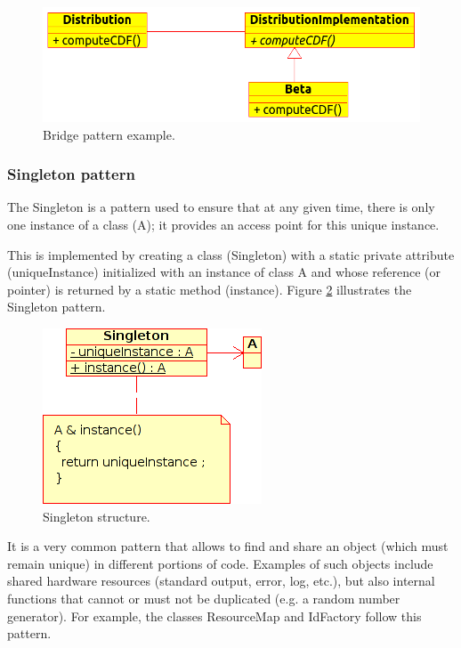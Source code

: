 \begin{figure}[htb]
\begin{center}
\includegraphics[scale=0.5]{Figures/modeling_notions/bridge.png}
\caption{Bridge pattern example.}\label{fig:bridge}
\end{center}
\end{figure}


\label{singleton}\subsubsection{Singleton pattern}

The Singleton is a pattern used to ensure that at any given time, there is only one instance of a class (A); it provides an access point for this unique instance.

This is implemented by creating a class (Singleton) with a static private attribute (uniqueInstance) initialized with an instance of class A and whose reference (or pointer) is returned by a static method (instance). Figure \ref{fig:singleton} illustrates the Singleton pattern.

\begin{figure}[htb]
\begin{center}
\includegraphics[scale=0.5]{Figures/modeling_notions/singleton.png}
\caption{Singleton structure.}\label{fig:singleton}
\end{center}
\end{figure}

It is a very common pattern that allows to find and share an object (which must remain unique) in different portions of code.
Examples of such objects include shared hardware resources (standard output, error, log, etc.), but also internal functions that cannot or must not be duplicated (e.g. a random number generator).
For example, the classes ResourceMap and IdFactory follow this pattern.

